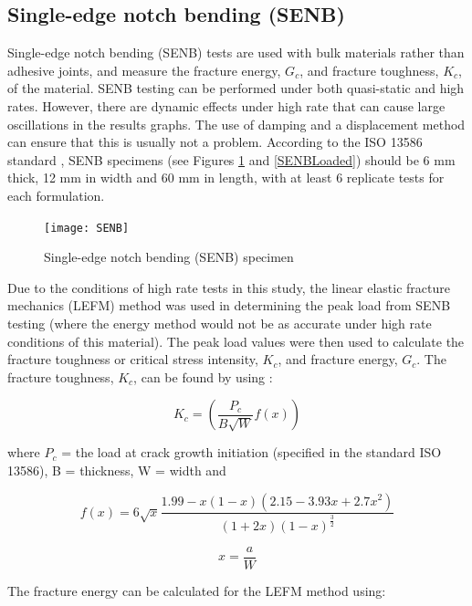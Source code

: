 \documentclass[numbers=noendperiod,chapterprefix=on]{icldt} %
\begin{document}
\subsection{Single-edge notch bending (SENB)}
Single-edge notch bending (SENB) tests are used with bulk materials rather than adhesive joints, and measure the fracture energy, $G_c$, and fracture toughness, $K_c$, of the material. SENB testing can be performed under both quasi-static and high rates. However, there are dynamic effects under high rate that can cause large oscillations in the results graphs. The use of damping and a displacement method can ensure that this is usually not a problem. 
According to the ISO 13586 standard \cite{D50232007}, SENB specimens (see Figures \ref{SENB_specimen} and \ref{SENBLoaded}) should be 6 mm thick, 12 mm in width and 60 mm in length, with at least 6 replicate tests for each formulation. 

\begin{figure}[!htpb]
\centering
\texttt{[image: SENB]}
\caption{Single-edge notch bending (SENB) specimen \cite{D50232007}} \label{SENB_specimen}
\end{figure}

Due to the conditions of high rate tests in this study, the linear elastic fracture mechanics (LEFM) method was used in determining the peak load from SENB testing (where the energy method would not be as accurate under high rate conditions of this material). The peak load values were then used to calculate the fracture toughness or critical stress intensity, $K_c$, and fracture energy, $G_c$.
The fracture toughness, $K_c$, can be found by using  \cite{Chong2015,ISO13586}: 

\begin{equation} 
K_c = (\dfrac{P_c}{B \sqrt{W} }f(x))
\end{equation}

where $ P_{c} $ = the load at crack growth initiation (specified in the standard ISO 13586), B = thickness, W = width and 

\begin{equation}
f(x) = 6\sqrt{x} \dfrac{1.99-x(1-x)(2.15-3.93x+2.7x^{2})}{(1+2x)(1-x)^{\frac{3}{2}}}
\end{equation}

\begin{equation}
x = \dfrac{a}{W}
\end{equation}


The fracture energy can be calculated for the LEFM method \cite{Karac2011} using:
\end{document}
